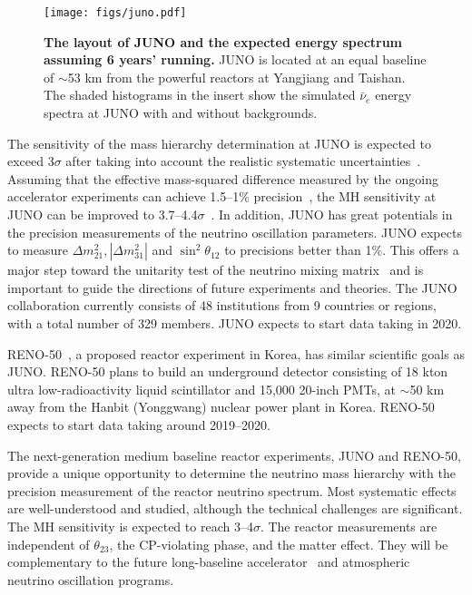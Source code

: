 \begin{figure}[tb] \label{fig:juno}
  \centering
  \texttt{[image: figs/juno.pdf]}
  \caption{{\bf The layout of JUNO and the expected energy spectrum assuming 6 years' running.} JUNO is located at an equal baseline of $\sim$53 km from the powerful reactors at Yangjiang and Taishan. The shaded histograms in the insert show the simulated $\bar\nu_e$ energy spectra at JUNO with and without backgrounds.}
\end{figure}

The sensitivity of the mass hierarchy determination at JUNO is expected to exceed 3$\sigma$ after taking into account the realistic systematic uncertainties~\cite{Li-PRD13}. 
Assuming that the effective mass-squared difference measured by the ongoing accelerator experiments can achieve 1.5--1\% precision~\cite{Agarwalla}, the MH sensitivity at JUNO can be improved to 3.7--4.4$\sigma$~\cite{Li-PRD13}. 
In addition, JUNO has great potentials in the precision measurements of the neutrino oscillation parameters. JUNO expects to measure $\Delta m^2_{21}, |\Delta m^2_{31}|$ and $\sin^2 \theta_{12}$ to precisions better than 1\%. This offers a major step toward the unitarity test of the neutrino mixing matrix~\cite{unitarity13} and is important to guide the directions of future experiments and theories. The JUNO collaboration currently consists of 48 institutions from 9 countries or regions, with a total number of 329 members. JUNO expects to start data taking in 2020.

RENO-50~\cite{RENO-50}, a proposed reactor experiment in Korea, has similar scientific goals as JUNO. RENO-50 plans to build an underground detector consisting of 18 kton ultra low-radioactivity liquid
scintillator and 15,000 20-inch PMTs, at $\sim$50 km away from the Hanbit (Yonggwang) nuclear power plant in Korea. RENO-50 expects to start data taking around 2019--2020.

The next-generation medium baseline reactor experiments, JUNO and RENO-50, provide a unique opportunity to determine the neutrino mass hierarchy with the precision measurement of the reactor neutrino spectrum.
Most systematic effects are well-understood and studied, although the technical challenges are significant. 
The MH sensitivity is expected to reach 3--4$\sigma$.
The reactor measurements are independent of $\theta_{23}$, the CP-violating phase, and the matter effect. 
They will be complementary to the future long-baseline accelerator~\cite{LBNE} and atmospheric~\cite{PINGU} neutrino oscillation programs. 



